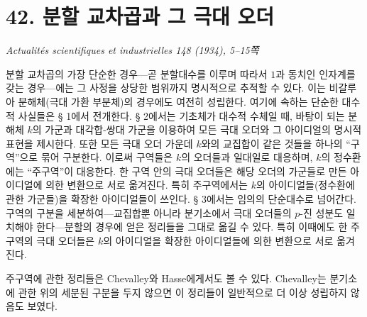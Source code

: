 
\section*{42. 분할 교차곱과 그 극대 오더}

\begin{center}
\emph{Actualités scientifiques et industrielles 148 (1934), 5--15쪽}
\end{center}

분할 교차곱의 가장 단순한 경우---곧 분할대수를 이루며 따라서 $1$과 동치인 인자계를 갖는 경우---에는 그 사정을 상당한 범위까지 명시적으로 추적할 수 있다. 이는 비갈루아 분해체(극대 가환 부분체)의 경우에도 여전히 성립한다. 여기에 속하는 단순한 대수적 사실들은 § 1에서 전개한다. § 2에서는 기초체가 대수적 수체일 때, 바탕이 되는 분해체 $k$의 가군과 대각합-쌍대 가군을 이용하여 모든 극대 오더와 그 아이디얼의 명시적 표현을 제시한다. 또한 모든 극대 오더 가운데 $k$와의 교집합이 같은 것들을 하나의 ``구역''으로 묶어 구분한다. 이로써 구역들은 $k$의 오더들과 일대일로 대응하며, $k$의 정수환에는 ``주구역''이 대응한다. 한 구역 안의 극대 오더들은 해당 오더의 가군들로 만든 아이디얼에 의한 변환으로 서로 옮겨진다. 특히 주구역에서는 $k$의 아이디얼들(정수환에 관한 가군들)을 확장한 아이디얼들이 쓰인다. § 3에서는 임의의 단순대수로 넘어간다. 구역의 구분을 세분하여---교집합뿐 아니라 분기소에서 극대 오더들의 $p$-진 성분도 일치해야 한다---분할의 경우에 얻은 정리들을 그대로 옮길 수 있다. 특히 이때에도 한 주구역의 극대 오더들은 $k$의 아이디얼을 확장한 아이디얼들에 의한 변환으로 서로 옮겨진다.

주구역에 관한 정리들은 Chevalley와 Hasse에게서도 볼 수 있다. Chevalley는 분기소에 관한 위의 세분된 구분을 두지 않으면 이 정리들이 일반적으로 더 이상 성립하지 않음도 보였다.

